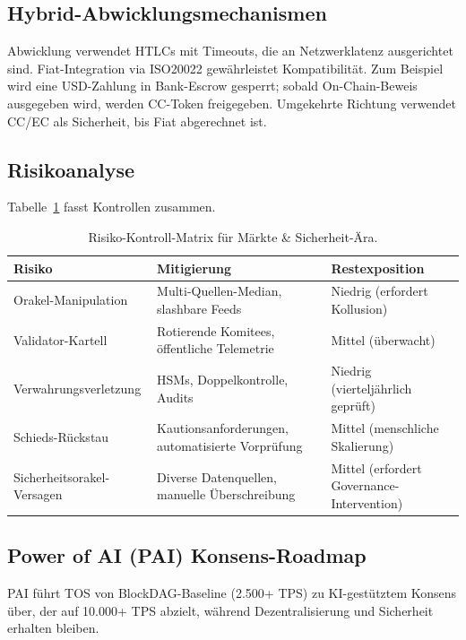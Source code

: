 \documentclass[11pt]{article}
\begin{document}
\subsection{Hybrid-Abwicklungsmechanismen}
Abwicklung verwendet HTLCs mit Timeouts, die an Netzwerklatenz ausgerichtet sind. Fiat-Integration via ISO20022 gewährleistet Kompatibilität. Zum Beispiel wird eine USD-Zahlung in Bank-Escrow gesperrt; sobald On-Chain-Beweis ausgegeben wird, werden CC-Token freigegeben. Umgekehrte Richtung verwendet CC/EC als Sicherheit, bis Fiat abgerechnet ist.

\subsection{Risikoanalyse}
Tabelle~\ref{tab:risk-markets} fasst Kontrollen zusammen.

\begin{table}[H]
  \centering
  \begin{tabular}{p{}p{}p{}}
    \toprule
    \textbf{Risiko} & \textbf{Mitigierung} & \textbf{Restexposition} \\
    \midrule
    Orakel-Manipulation & Multi-Quellen-Median, slashbare Feeds & Niedrig (erfordert Kollusion) \\
    Validator-Kartell & Rotierende Komitees, öffentliche Telemetrie & Mittel (überwacht) \\
    Verwahrungsverletzung & HSMs, Doppelkontrolle, Audits & Niedrig (vierteljährlich geprüft) \\
    Schieds-Rückstau & Kautionsanforderungen, automatisierte Vorprüfung & Mittel (menschliche Skalierung) \\
    Sicherheitsorakel-Versagen & Diverse Datenquellen, manuelle Überschreibung & Mittel (erfordert Governance-Intervention) \\
    \bottomrule
  \end{tabular}
  \caption{Risiko-Kontroll-Matrix für Märkte \& Sicherheit-Ära.}
  \label{tab:risk-markets}
\end{table}

\subsection{Power of AI (PAI) Konsens-Roadmap}
\label{sec:pai-roadmap}
PAI führt TOS von BlockDAG-Baseline (2.500+ TPS) zu KI-gestütztem Konsens über, der auf 10.000+ TPS abzielt, während Dezentralisierung und Sicherheit erhalten bleiben.
\end{document}
